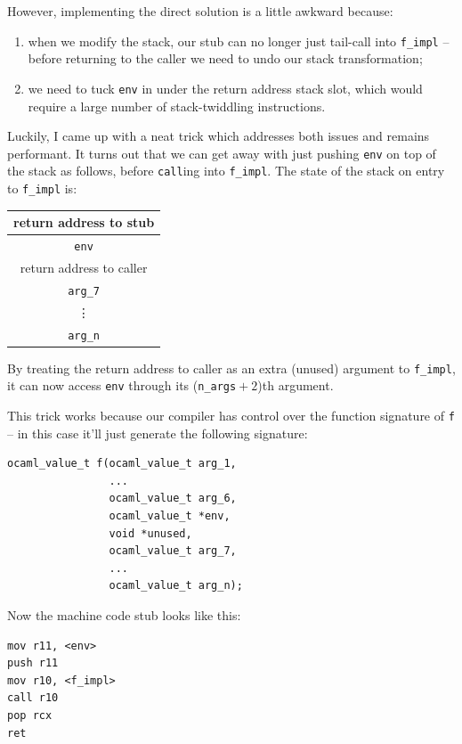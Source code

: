 \documentclass[12pt,a4paper,twoside,openright]{report}
\begin{document}
However, implementing the direct solution is a little awkward because:
\begin{enumerate}
  \item when we modify the stack, our stub can no longer just tail-call
    into \lstinline!f_impl! -- before returning to the caller we need to undo
    our stack transformation;
  \item we need to tuck \lstinline!env! in under the return address
    stack slot, which would require a large number of stack-twiddling
    instructions.
\end{enumerate}

Luckily, I came up with a neat trick which addresses both issues and remains
performant. It turns out that we can get away with just pushing \lstinline!env!
on top of the stack as follows, before \lstinline!call!ing into
\lstinline!f_impl!. The state of the stack on entry to \lstinline!f_impl! is:

\begin{tabular}{c}
  return address to stub
  \\ \hline\hline
  \lstinline!env!
  \\ \hline
  return address to caller
  \\ \hline
  \lstinline!arg_7!
  \\ \hline
  \vdots
  \\ \hline
  \lstinline!arg_n!
\end{tabular}

By treating the return address to caller as an extra (unused) argument to
\lstinline!f_impl!, it can now access \lstinline!env! through its
(\lstinline{n_args}${}+2$)th argument.

This trick works because our compiler has control over the function signature
of \lstinline{f} -- in this case it'll just generate the following signature:

\begin{lstlisting}
ocaml_value_t f(ocaml_value_t arg_1,
                ...
                ocaml_value_t arg_6,
                ocaml_value_t *env,
                void *unused,
                ocaml_value_t arg_7,
                ...
                ocaml_value_t arg_n);
\end{lstlisting}

Now the machine code stub looks like this:

\begin{lstlisting}
mov r11, <env>
push r11
mov r10, <f_impl>
call r10
pop rcx
ret
\end{lstlisting}
\end{document}
